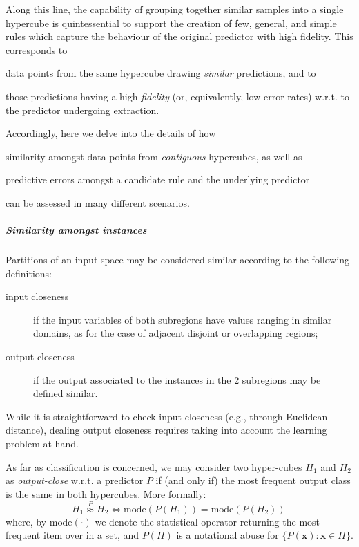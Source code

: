 \documentclass[
]{ceurart}
\begin{document}
Along this line, the capability of grouping together similar samples into a single hypercube is quintessential to support the creation of few, general, and simple rules %
which capture the behaviour of the original predictor with high fidelity.
%
This corresponds to
%
\begin{inlinelist}
	\item data points from the same hypercube drawing \emph{similar} predictions, and to
	\item those predictions having a high \emph{fidelity} (or, equivalently, low error rates) w.r.t. to the predictor undergoing extraction.
\end{inlinelist}
%
Accordingly, here we delve into the details of how 
%
\begin{inlinelist}
	\item similarity amongst data points from \emph{contiguous} hypercubes, as well as
	\item predictive errors amongst a candidate rule and the underlying predictor
\end{inlinelist}
%
can be assessed in many different scenarios.

\subparagraph{Similarity amongst instances}

Partitions of an input space may be considered similar according to the following definitions:
%
\begin{description}
	\item[input closeness] if the input variables of both subregions have values ranging in similar domains, as for the case of adjacent disjoint or overlapping regions;
	\item[output closeness] if the output associated to the instances in the 2 subregions may be defined similar.
\end{description}
%
While it is straightforward to check input closeness (e.g., through Euclidean distance), dealing output closeness requires taking into account the learning problem at hand.

As far as classification is concerned, we may consider two hyper-cubes $H_1$ and $H_2$ as \emph{output-close} w.r.t. a predictor $P$ if (and only if) the most frequent output class is the same in both hypercubes.
%
More formally:
%
\begin{equation}\label{eq:simClass}
	H_1 \stackrel{P}{\approx} H_2 \Leftrightarrow \text{mode}(P(H_1)) = \text{mode}(P(H_2))\,
\end{equation}
%
where, by $\text{mode}(\cdot)$ we denote the statistical operator returning the most frequent item over in a set, and $P(H)$ is a notational abuse for $\{ P(\textbf{x}) : \textbf{x} \in H \}$.
\end{document}

